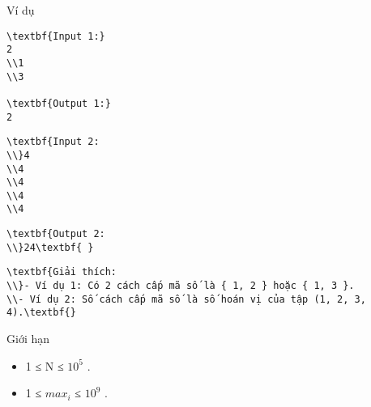 Ví dụ
\begin{verbatim}
\textbf{Input 1:}
2
\\1
\\3

\textbf{Output 1:}
2\end{verbatim}
\begin{verbatim}
\textbf{Input 2:
\\}4
\\4
\\4
\\4
\\4 \end{verbatim}
\begin{verbatim}
\textbf{Output 2:
\\}24\textbf{ }\end{verbatim}
\begin{verbatim}
\textbf{Giải thích:
\\}- Ví dụ 1: Có 2 cách cấp mã số là { 1, 2 } hoặc { 1, 3 }.
\\- Ví dụ 2: Số cách cấp mã số là số hoán vị của tập (1, 2, 3, 4).\textbf{}\end{verbatim}
Giới hạn
\begin{itemize}
	\item     1 ≤ N ≤ $10^{5}$    .   
	\item     1 ≤ $max_{i}$    ≤ $10^{9}$    .   
\end{itemize}